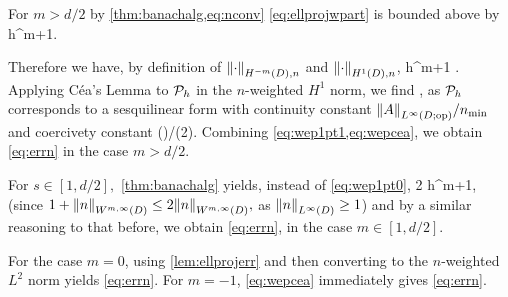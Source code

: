 For $m > d/2$ by \cref{thm:banachalg,eq:nconv} \cref{eq:ellprojwpart} is bounded above by
\beq\label{eq:wep1pt0}
     h^{m+1}.
\eeq


Therefore we have, by definition of $\NHnfn{-m}{D}{\cdot}$ and $\NHoDn{\cdot}$,
\beq\label{eq:wep1pt1}
 \leq {}    h^{m+1} .
\eeq
Applying C\'ea's Lemma to $\mathcal P_{h}$ in the $n$-weighted $H^1$ norm, we find
\beq\label{eq:wepcea}
 \leq {}\nvar{},
\eeq
as $\mathcal P_{h}$ corresponds to a sesquilinear form with continuity constant $\NLiDop{A}/\nmin$ and coercivety constant
\beqs
\mleft(\Amin\min{}\mright)/\mleft(2\mright).
\eeqs
Combining \cref{eq:wep1pt1,eq:wepcea}, we obtain \cref{eq:errn} in the case $m > d/2$.

For $s \in [1,d/2],$ \cref{thm:banachalg} yields, instead of \cref{eq:wep1pt0},
\beq\label{eq:wep2pt1}
2     h^{m+1},
\eeq
(since $1 + \NWmiD{n} \leq 2\NWmiD{n},$ as $\NLiD{n} \geq 1$) and by a similar reasoning to that before, we obtain \cref{eq:errn}, in the case $m \in [1,d/2]$.

For the case $m=0$, using \cref{lem:ellprojerr} and then converting to the $n$-weighted $L^2$ norm yields \cref{eq:errn}. For $m=-1$, \cref{eq:wepcea} immediately gives \cref{eq:errn}. 
\epf



